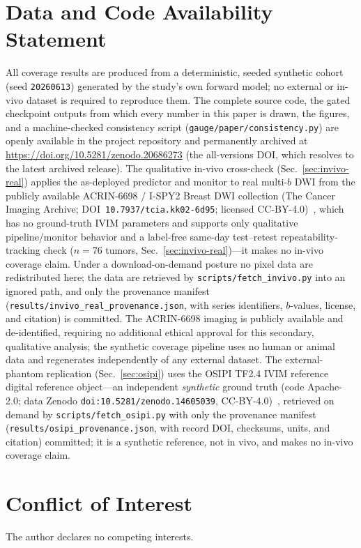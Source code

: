 \documentclass[11pt]{article}
\begin{document}
\section*{Data and Code Availability Statement}
All coverage results are produced from a deterministic, seeded synthetic cohort
(seed \texttt{20260613}) generated by the study's own forward model; no external or
in-vivo dataset is required to reproduce them. The complete source code, the gated
checkpoint outputs from which every number in this paper is drawn, the figures, and
a machine-checked consistency script (\texttt{gauge/paper/consistency.py}) are
openly available in the project repository and permanently archived at
\href{https://doi.org/10.5281/zenodo.20686273}{https://doi.org/10.5281/zenodo.20686273}
(the all-versions DOI, which resolves to the latest archived release).
The qualitative in-vivo cross-check (Sec.~\ref{sec:invivo-real}) applies the
as-deployed predictor and monitor to real multi-$b$ DWI from the publicly available
ACRIN-6698 / I-SPY2 Breast DWI collection (The Cancer Imaging Archive;
DOI~\texttt{10.7937/tcia.kk02-6d95}; licensed CC-BY-4.0)~\cite{acrin6698,clark2013tcia},
which has no ground-truth IVIM parameters and supports only qualitative
pipeline/monitor behavior and a label-free same-day test--retest
repeatability-tracking check ($n{=}76$ tumors, Sec.~\ref{sec:invivo-real})---it
makes no in-vivo coverage claim. Under a
download-on-demand posture no pixel data are redistributed here; the data are
retrieved by \texttt{scripts/fetch\_invivo.py} into an ignored path, and only the
provenance manifest (\texttt{results/invivo\_real\_provenance.json}, with series
identifiers, $b$-values, license, and citation) is committed. The ACRIN-6698 imaging
is publicly available and de-identified, requiring no additional ethical approval for
this secondary, qualitative analysis; the synthetic coverage pipeline uses no human
or animal data and regenerates independently of any external dataset.
The external-phantom replication (Sec.~\ref{sec:osipi}) uses the OSIPI TF2.4 IVIM
reference digital reference object---an independent \emph{synthetic} ground truth
(code Apache-2.0; data Zenodo \texttt{doi:10.5281/zenodo.14605039},
CC-BY-4.0)~\cite{osipi_ivim}, retrieved on demand by \texttt{scripts/fetch\_osipi.py}
with only the provenance manifest (\texttt{results/osipi\_provenance.json}, with
record DOI, checksums, units, and citation) committed; it is a synthetic reference,
not in vivo, and makes no in-vivo coverage claim.

\section*{Conflict of Interest}
The author declares no competing interests.
\end{document}
